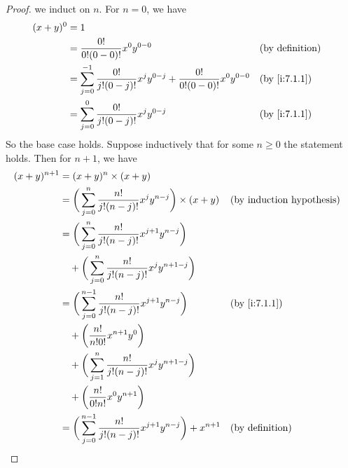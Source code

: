 \begin{proof}
  we induct on \(n\).
  For \(n = 0\), we have
  \begin{align*}
    (x + y)^0 & = 1                                                                                                                         \\
              & = \dfrac{0!}{0!(0 - 0)!} x^0 y^{0 - 0}                                                          &  & \text{(by definition)} \\
              & = \sum_{j = 0}^{-1} \dfrac{0!}{j!(0 - j)!} x^j y^{0 - j} + \dfrac{0!}{0!(0 - 0)!} x^0 y^{0 - 0} &  & \by{i:7.1.1}           \\
              & = \sum_{j = 0}^0 \dfrac{0!}{j!(0 - j)!} x^j y^{0 - j}                                           &  & \by{i:7.1.1}
  \end{align*}
  So the base case holds.
  Suppose inductively that for some \(n \geq 0\) the statement holds.
  Then for \(n + 1\), we have
  \begin{align*}
    (x + y)^{n + 1} & = (x + y)^n \times (x + y)                                                                                              \\
                    & = \bigg(\sum_{j = 0}^n \dfrac{n!}{j!(n - j)!} x^j y^{n - j}\bigg) \times (x + y)            &  & \byIH                  \\
                    & = \bigg(\sum_{j = 0}^n \dfrac{n!}{j!(n - j)!} x^{j + 1} y^{n - j}\bigg)                                                 \\
                    & \quad + \bigg(\sum_{j = 0}^n \dfrac{n!}{j!(n - j)!} x^j y^{n + 1 - j}\bigg)                                             \\
                    & = \bigg(\sum_{j = 0}^{n - 1} \dfrac{n!}{j!(n - j)!} x^{j + 1} y^{n - j}\bigg)               &  & \by{i:7.1.1}           \\
                    & \quad + \bigg(\dfrac{n!}{n!0!} x^{n + 1} y^0\bigg)                                                                      \\
                    & \quad + \bigg(\sum_{j = 1}^n \dfrac{n!}{j!(n - j)!} x^j y^{n + 1 - j}\bigg)                                             \\
                    & \quad + \bigg(\dfrac{n!}{0!n!} x^0 y^{n + 1}\bigg)                                                                      \\
                    & = \bigg(\sum_{j = 0}^{n - 1} \dfrac{n!}{j!(n - j)!} x^{j + 1} y^{n - j}\bigg) + x^{n + 1}   &  & \text{(by definition)} \\

\end{align*}
\end{proof}
